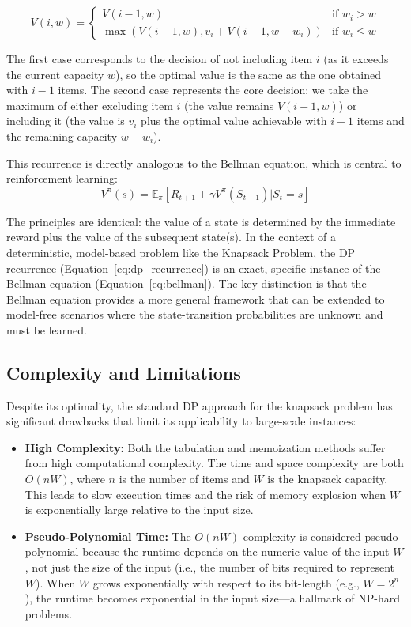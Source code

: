 \begin{equation}
\label{eq:dp_recurrence}
V(i, w) = 
\begin{cases} 
V(i-1, w) & \text{if } w_i > w \\
\max(V(i-1, w), v_i + V(i-1, w - w_i)) & \text{if } w_i \leq w 
\end{cases}
\end{equation}

The first case corresponds to the decision of not including item \(i\) (as it exceeds the current capacity \(w\)), so the optimal value is the same as the one obtained with \(i-1\) items. The second case represents the core decision: we take the maximum of either excluding item \(i\) (the value remains \(V(i-1, w)\)) or including it (the value is \(v_i\) plus the optimal value achievable with \(i-1\) items and the remaining capacity \(w - w_i\)).

This recurrence is directly analogous to the Bellman equation, which is central to reinforcement learning:
\begin{equation}
\label{eq:bellman}
V^{\pi}(s) = \mathbb{E}_{\pi} [R_{t+1} + \gamma V^{\pi}(S_{t+1}) | S_t = s]
\end{equation}

The principles are identical: the value of a state is determined by the immediate reward plus the value of the subsequent state(s). In the context of a deterministic, model-based problem like the Knapsack Problem, the DP recurrence (Equation~\ref{eq:dp_recurrence}) is an exact, specific instance of the Bellman equation (Equation~\ref{eq:bellman}). The key distinction is that the Bellman equation provides a more general framework that can be extended to model-free scenarios where the state-transition probabilities are unknown and must be learned.

\subsection{Complexity and Limitations}

Despite its optimality, the standard DP approach for the knapsack problem has significant drawbacks that limit its applicability to large-scale instances:

\begin{itemize}
    \item \textbf{High Complexity:} Both the tabulation and memoization methods suffer from high computational complexity. The time and space complexity are both \(O(nW)\), where \(n\) is the number of items and \(W\) is the knapsack capacity. This leads to slow execution times and the risk of memory explosion when \(W\) is exponentially large relative to the input size.
    
    \item \textbf{Pseudo-Polynomial Time:} The \(O(nW)\) complexity is considered pseudo-polynomial because the runtime depends on the numeric value of the input \(W\), not just the size of the input (i.e., the number of bits required to represent \(W\)). When \(W\) grows exponentially with respect to its bit-length (e.g., \(W=2^n\)), the runtime becomes exponential in the input size---a hallmark of NP-hard problems.
\end{itemize}

